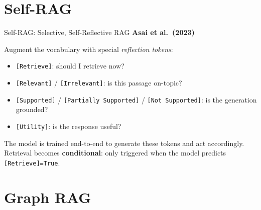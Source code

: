 \documentclass[aspectratio=169,10pt]{beamer}
\begin{document}
\section{Self-RAG}

\begin{frame}{Self-RAG: Selective, Self-Reflective RAG}
  \textbf{Asai et al.\ (2023)}~\cite{asai2023selfrag}
  \vspace{0.4em}
  \begin{tcolorbox}[hitbox, title=Self-RAG Tokens]
    Augment the vocabulary with special \emph{reflection tokens}:
    \begin{itemize}
      \item \texttt{[Retrieve]}: should I retrieve now?
      \item \texttt{[Relevant]} / \texttt{[Irrelevant]}: is this passage on-topic?
      \item \texttt{[Supported]} / \texttt{[Partially Supported]} / \texttt{[Not Supported]}: is the generation grounded?
      \item \texttt{[Utility]}: is the response useful?
    \end{itemize}
  \end{tcolorbox}
  \vspace{0.3em}
  The model is trained end-to-end to generate these tokens and act accordingly.
  Retrieval becomes \textbf{conditional}: only triggered when the model predicts \texttt{[Retrieve]=True}.
\end{frame}

\section{Graph RAG}
\end{document}

